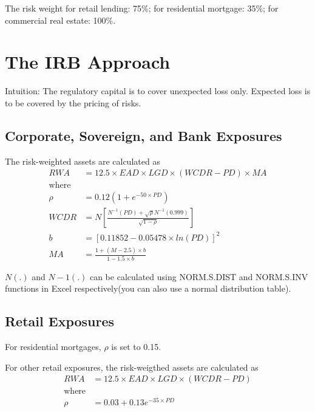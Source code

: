 \documentclass[12pt]{article} 
\begin{document}
The risk weight for retail lending: 75\%; for residential mortgage: 35\%; for
commercial real estate: 100\%.

\section*{The IRB Approach}

Intuition: The regulatory capital is to cover unexpected loss only. Expected
loss is to be covered by the pricing of risks.

\subsection*{Corporate, Sovereign, and Bank Exposures}

The risk-weighted assets are calculated as
\begin{align*}
  RWA & = 12.5 \times EAD \times LGD \times (WCDR - PD) \times MA \\
  \textrm{where} \\
  \rho & = 0.12(1 + e^{-50 \times PD}) \\
  WCDR & = N[\frac{ N^{-1} (PD) +\sqrt{\rho} N^{-1} (0.999) }{ \sqrt{ 1 - \rho } }] \\
  b & = [0.11852 - 0.05478 \times ln(PD)]^{2} \\
  MA & = \frac{ 1 + (M-2.5) \times b }{ 1 - 1.5 \times b }
\end{align*}

\(N(.)\) and \(N-1(.)\) can be calculated using NORM.S.DIST and NORM.S.INV
functions in Excel respectively(you can also use a normal distribution table).

\subsection*{Retail Exposures}

For residential mortgages, \(\rho\) is set to 0.15.

For other retail exposures, the risk-weigthed assets are calculated as
\begin{align*}
  RWA & = 12.5 \times EAD \times LGD \times (WCDR - PD) \\
  \textrm{where} \\
  \rho & = 0.03 + 0.13 e^{-35 \times PD}
\end{align*}


\FloatBarrier


\end{document}
